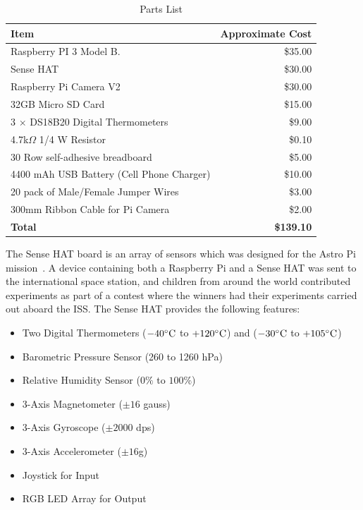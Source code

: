 \documentclass[journal]{new-aiaa}
\begin{document}
\begin{table}
    \begin{center}
    \begin{tabular}{l|r}
        {\bf Item} & {\bf Approximate Cost}\\
        \hline
        Raspberry PI 3 Model B. & \$35.00\\
        Sense HAT & \$30.00\\
        Raspberry Pi Camera V2& \$30.00\\
        32GB Micro SD Card & \$15.00\\
        3 $\times$ DS18B20 Digital Thermometers & \$9.00\\
        4.7k$\Omega$ 1/4 W Resistor & \$0.10\\
        30 Row self-adhesive breadboard & \$5.00\\
        4400 mAh USB Battery (Cell Phone Charger) & \$10.00\\ 
        20 pack of Male/Female Jumper Wires & \$3.00\\
        300mm Ribbon Cable for Pi Camera & \$2.00\\
        \hline
        {\bf Total} & {\bf\$139.10} \\
    \end{tabular}
    \caption{Parts List}
    \label{tab:parts}
    \end{center}
\end{table}

The Sense HAT board is an array of sensors which was designed for the
Astro Pi mission~\cite{MagpiSenseHat}.  A device containing both
a Raspberry Pi and a Sense HAT was sent to the international space
station, and children from around the world contributed experiments as
part of a contest where the winners had their experiments carried out
aboard the ISS.  The Sense HAT provides the following features:

\begin{itemize}
    \item Two Digital Thermometers ($-40 \celsius$ to $+120 \celsius$)
    \cite{HTS221} and ($-30 \celsius$ to $+105 \celsius$)\cite{LPS25H}
    \item Barometric Pressure Sensor (260 to 1260 hPa) ~\cite{LPS25H}
    \item Relative Humidity Sensor ($0\%$ to $100\%$)~\cite{HTS221}
    \item 3-Axis Magnetometer ($\pm 16$ gauss)~\cite{LSM9DS1}
    \item 3-Axis Gyroscope ($\pm 2000$ dps)~\cite{LSM9DS1}
    \item 3-Axis Accelerometer ($\pm 16$g)~\cite{LSM9DS1}
    \item Joystick for Input
    \item RGB LED Array for Output
\end{itemize}
\end{document}
